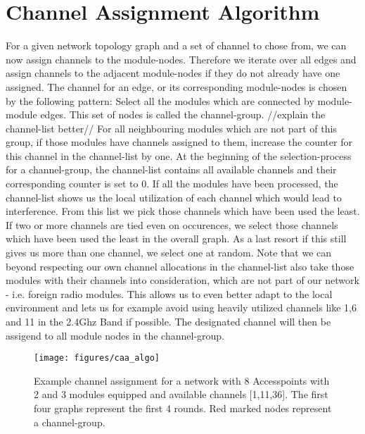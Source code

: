 \section{Channel Assignment Algorithm}
  For a given network topology graph and a set of channel to chose from, we can now assign channels to the module-nodes. Therefore we iterate over all 
  edges and assign channels to the adjacent module-nodes if they do not already have one assigned. The channel for an edge, 
  or its corresponding module-nodes is chosen by the following pattern:
  Select all the modules which are connected by module-module edges. This set of nodes is called the channel-group. //explain the channel-list better//
  For all neighbouring modules which are not part of this group, if those modules have channels assigned to them, 
  increase the counter for this channel in the channel-list by one. At the beginning of the selection-process for a channel-group, the channel-list contains
  all available channels and their corresponding counter is set to 0.
  If all the modules have been processed, the channel-list shows us the local utilization of each channel which would lead to interference.
  From this list we pick those channels which have been used the least. If two or more channels are tied even on occurences, we select those channels which have
  been used the least in the overall graph. As a last resort if this still gives us more than one channel, we select one at random.
  Note that we can beyond respecting our own channel allocations in the channel-list also take those modules with their channels into consideration, 
  which are not part of our network - i.e. foreign radio modules. This allows us to even better adapt to the local environment and lets us for example
  avoid using heavily utilized channels like 1,6 and 11 in the 2.4Ghz Band if possible.
  The designated channel will then be assigend to all module nodes in the channel-group.
  \begin{figure}[h]
    \centering
    \texttt{[image: figures/caa\_algo]}
    \caption{Example channel assignment for a network with 8 Accesspoints with 2 and 3 modules equipped and available channels [1,11,36]. 
    The first four graphs represent the first 4 rounds. Red marked nodes represent a channel-group.}
    \label{fig:caa_algo}
  \end{figure}
